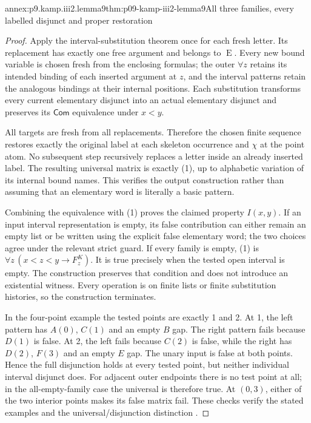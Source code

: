\begin{annexitem}{annex:p9.kamp.iii2.lemma9}{thm:p09-kamp-iii2-lemma9}{All three families, every labelled disjunct and proper restoration}
\begin{proof}
Apply the interval-substitution theorem once for each fresh letter.
Its replacement has exactly one free argument and belongs to
\(\operatorname{E}\). Every new bound variable is chosen fresh
from the enclosing formulas; the outer \(\forall z\) retains
its intended binding of each inserted argument at \(z\), and
the interval patterns retain the analogous bindings at their internal
positions. Each substitution transforms every current elementary
disjunct into an actual elementary disjunct and preserves its
\(\mathsf{Com}\) equivalence under \(x<y\).

All targets are fresh from all replacements. Therefore the chosen
finite sequence restores exactly the original label at each skeleton
occurrence and \(\chi\) at the point atom. No subsequent step
recursively replaces a letter inside an already inserted label.
The resulting universal matrix is exactly (1), up to alphabetic
variation of its internal bound names. This verifies the output
construction rather than assuming that an elementary word is literally
a basic pattern.

Combining the equivalence with (1) proves the claimed property
\(I(x,y)\). If an input interval representation is empty,
its false contribution can either remain an empty list or be written
using the explicit false elementary word; the two choices agree under
the relevant strict guard. If every family is empty, (1) is
\(\forall z\,(x<z<y\to F^K_z)\). It is true precisely
when the tested open interval is empty. The construction preserves
that condition and does not introduce an existential witness.
Every operation is on finite lists or finite substitution histories,
so the construction terminates.

In the four-point example the tested points are exactly 1 and 2.
At 1, the left pattern has \(A(0)\), \(C(1)\) and an
empty \(B\) gap. The right pattern fails because \(D(1)\)
is false. At 2, the left fails because \(C(2)\) is false,
while the right has \(D(2)\), \(F(3)\) and an empty
\(E\) gap. The unary input is false at both points. Hence
the full disjunction holds at every tested point, but neither
individual interval disjunct does. For adjacent outer endpoints
there is no test point at all; in the all-empty-family case the
universal is therefore true. At \((0,3)\), either of the
two interior points makes its false matrix fail. These checks
verify the stated examples and the universal/disjunction distinction
\cite[ch.~III, pp.~92--93]{Kamp1968}.
\end{proof}
\end{annexitem}
